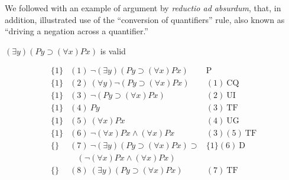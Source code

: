 We followed with an example of argument by \emph{reductio ad absurdum}, that, in addition, illustrated use of the ``conversion of quantifiers'' rule, also known as ``driving a negation across a quantifier.'' 
\begin{center}
$(\exists y)(Py \supset (\forall x)Px)$ is valid
\end{center}
\[
\begin{array}{lll}
\{1\}   & (1)\ \neg (\exists y)(Py \supset (\forall x)Px)  & \mathrm{P}\\
\{1\}   & (2)\ (\forall y) \neg (Py \supset (\forall x)Px)  & (1)\
\mathrm{CQ}\\ 
\{1\}   & (3)\ \neg (Py \supset (\forall x)Px)  & (2)\ \mathrm{UI}\\
\{1\}   & (4)\ Py  & (3)\ \mathrm{TF}\\
\{1\}   & (5)\ (\forall x)Px  & (4)\ \mathrm{UG}\\
\{1\}   & (6)\ \neg (\forall x)Px \wedge (\forall x)Px  & (3)(5)\ \mathrm{TF}\\
\{\}   & (7)\ \neg (\exists y)(Py \supset (\forall x)Px) \supset & \{1\}(6)\
\mathrm{D}\\ 
  &\ \ \ \ (\neg (\forall x)Px \wedge (\forall x)Px) \\
\{\}   & (8)\ (\exists y)(Py \supset (\forall x)Px)  & (7)\ \mathrm{TF}
\end{array}
\]

